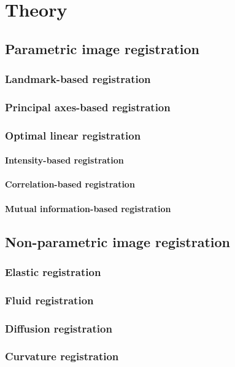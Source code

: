 \documentclass[
a4paper, 
12pt,
grayscalebody, %
abstract=on,
twoside, BCOR10mm, 12pt, DIV13,headinclude, footexclude, final, abstracton, openright
]{ibireprt}
\numberwithin{equation}{chapter}
\numberwithin{table}{chapter}
\numberwithin{figure}{chapter}
\numberwithin{algorithm}{chapter}
\numberwithin{example}{chapter}
\numberwithin{example}{chapter}
\begin{document}
	\chapter{Theory}
	\section{Parametric image registration}
		\subsection{Landmark-based registration}
		\subsection{Principal axes-based registration}
		\subsection{Optimal linear registration}
			\subsubsection{Intensity-based registration}
			\subsubsection{Correlation-based registration}
			\subsubsection{Mutual information-based registration}
	\section{Non-parametric image registration}
		\subsection{Elastic registration}
		\subsection{Fluid registration}
		\subsection{Diffusion registration}	
		\subsection{Curvature registration}	
\end{document}

